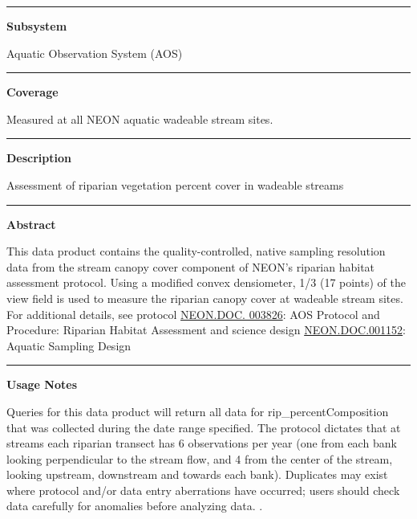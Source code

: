 \documentclass[]{article}
\begin{document}
\begin{center}\rule{0.5\linewidth}{\linethickness}\end{center}

\textbf{Subsystem}

Aquatic Observation System (AOS)

\begin{center}\rule{0.5\linewidth}{\linethickness}\end{center}

\textbf{Coverage}

Measured at all NEON aquatic wadeable stream sites.

\begin{center}\rule{0.5\linewidth}{\linethickness}\end{center}

\textbf{Description}

Assessment of riparian vegetation percent cover in wadeable streams

\begin{center}\rule{0.5\linewidth}{\linethickness}\end{center}

\textbf{Abstract}

This data product contains the quality-controlled, native sampling
resolution data from the stream canopy cover component of NEON's
riparian habitat assessment protocol. Using a modified convex
densiometer, 1/3 (17 points) of the view field is used to measure the
riparian canopy cover at wadeable stream sites. For additional details,
see protocol
\href{http://data.neonscience.org/api/v0/documents/NEON.DOC.003826vB}{NEON.DOC.
003826}: AOS Protocol and Procedure: Riparian Habitat Assessment and
science design
\href{http://data.neonscience.org/api/v0/documents/NEON.DOC.001152vA}{NEON.DOC.001152}:
Aquatic Sampling Design

\begin{center}\rule{0.5\linewidth}{\linethickness}\end{center}

\textbf{Usage Notes}

Queries for this data product will return all data for
rip\_percentComposition that was collected during the date range
specified. The protocol dictates that at streams each riparian transect
has 6 observations per year (one from each bank looking perpendicular to
the stream flow, and 4 from the center of the stream, looking upstream,
downstream and towards each bank). Duplicates may exist where protocol
and/or data entry aberrations have occurred; users should check data
carefully for anomalies before analyzing data. \newpage
.
\end{document}
